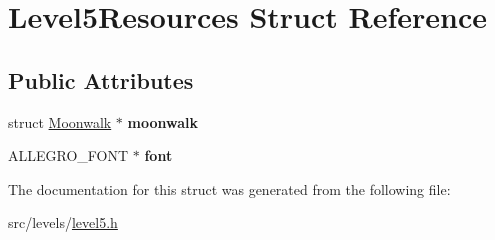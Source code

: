 \hypertarget{structLevel5Resources}{\section{Level5\+Resources Struct Reference}
\label{structLevel5Resources}
}
\subsection*{Public Attributes}
\begin{DoxyCompactItemize}
\item 
\hypertarget{structLevel5Resources_afbd474d5357e1e7dda04aec70d1813ec}{struct \hyperlink{structMoonwalk}{Moonwalk} $\ast$ {\bfseries moonwalk}}\label{structLevel5Resources_afbd474d5357e1e7dda04aec70d1813ec}

\item 
\hypertarget{structLevel5Resources_a202364babac8eb15e30b90cef4997d68}{A\+L\+L\+E\+G\+R\+O\+\_\+\+F\+O\+N\+T $\ast$ {\bfseries font}}\label{structLevel5Resources_a202364babac8eb15e30b90cef4997d68}

\end{DoxyCompactItemize}


The documentation for this struct was generated from the following file\+:\begin{DoxyCompactItemize}
\item 
src/levels/\hyperlink{level5_8h}{level5.\+h}\end{DoxyCompactItemize}
